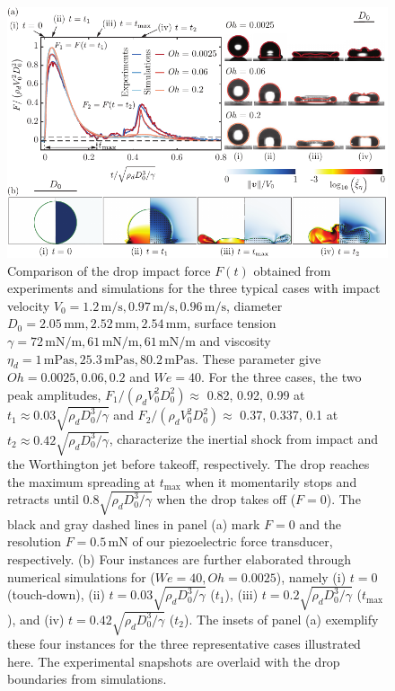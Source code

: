 \documentclass{jfm}
\begin{document}
	\begin{figure}
		\centering
		\includegraphics[width=\textwidth]{Figure1_summary_v6.pdf}
		\caption{Comparison of the drop impact force $F(t)$ obtained from experiments and simulations for the three typical cases with impact velocity $V_0 = 1.2\,\si{\meter}/\si{\second}, 0.97\,\si{\meter}/\si{\second}, 0.96\,\si{\meter}/\si{\second}$, diameter $D_0 = 2.05\,\si{\milli\meter}, 2.52\,\si{\milli\meter}, 2.54\,\si{\milli\meter}$, surface tension $\gamma = 72\,\si{\milli\newton}/\si{\meter}, 61\,\si{\milli\newton}/\si{\meter}, 61\,\si{\milli\newton}/\si{\meter}$ and viscosity $\eta_d = 1\,\si{\milli\pascal\second}, 25.3\,\si{\milli\pascal\second}, 80.2\,\si{\milli\pascal\second}$. These parameter give $Oh = 0.0025, 0.06, 0.2$ and $We = 40$.
			For the three cases, the two peak amplitudes, $F_1/(\rho_dV_0^2D_0^2) \approx$ 0.82, 0.92, 0.99 at $t_1 \approx 0.03\sqrt{\rho_dD_0^3/\gamma}$ and $F_2/(\rho_dV_0^2D_0^2) \approx$ 0.37, 0.337, 0.1 at $t_2 \approx 0.42\sqrt{\rho_dD_0^3/\gamma}$, characterize the inertial shock from impact and the Worthington jet before takeoff, respectively. 
			The drop reaches the maximum spreading at $t_{\text{max}}$ when it momentarily stops and retracts until $0.8\sqrt{\rho_dD_0^3/\gamma}$ when the drop takes off ($F = 0$). The black and gray dashed lines in panel (a) mark $F = 0$ and the resolution $F = 0.5\,\si{\milli\newton}$ of our piezoelectric force transducer, respectively.
			(b) Four instances are further elaborated through numerical simulations for ($We = 40, Oh = 0.0025$), namely (i) $t = 0$ (touch-down), (ii) $t = 0.03\sqrt{\rho_dD_0^3/\gamma}$ ($t_1$), (iii) $t = 0.2\sqrt{\rho_dD_0^3/\gamma}$ ($t_{\text{max}}$), and (iv) $t = 0.42\sqrt{\rho_dD_0^3/\gamma}$ ($t_2$).
			The insets of panel (a) exemplify these four instances for the three representative cases illustrated here. The experimental snapshots are overlaid with the drop boundaries from simulations. 
}
\end{figure}
\end{document}
